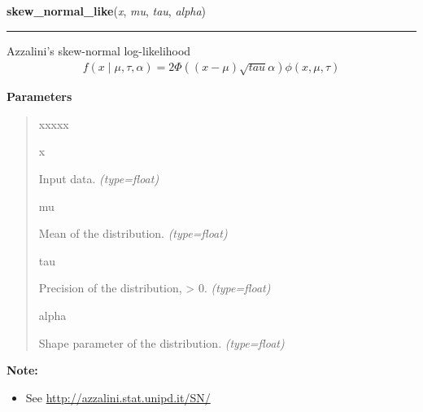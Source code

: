     \begin{boxedminipage}{\textwidth}

    \raggedright \textbf{skew\_normal\_like}(\textit{x}, \textit{mu}, \textit{tau}, \textit{alpha})

    \vspace{-1.5ex}

    \rule{\textwidth}{0.5\fboxrule}

Azzalini's skew-normal log-likelihood
\begin{equation*}\begin{split}f(x \mid \mu, \tau, \alpha) = 2 \Phi((x-\mu)\sqrt{tau}\alpha) \phi(x,\mu,\tau)\end{split}\end{equation*}    \vspace{1ex}

      \textbf{Parameters}
      \begin{quote}
        \begin{Ventry}{xxxxx}

          \item[x]


Input data.
            \textit{(type=float)}

          \item[mu]


Mean of the distribution.
            \textit{(type=float)}

          \item[tau]


Precision of the distribution, {\textgreater} 0.
            \textit{(type=float)}

          \item[alpha]


Shape parameter of the distribution.
            \textit{(type=float)}

        \end{Ventry}

      \end{quote}

    \vspace{1ex}

\textbf{Note:} \begin{itemize}
\item {} 
See \href{http://azzalini.stat.unipd.it/SN/}{http://azzalini.stat.unipd.it/SN/}

\end{itemize}


    \end{boxedminipage}

